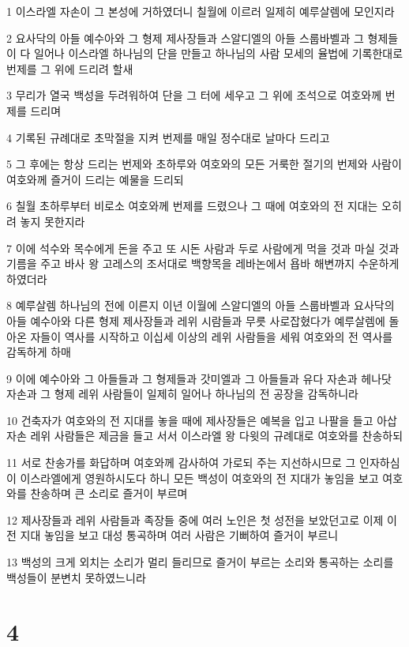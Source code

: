 \par 1 이스라엘 자손이 그 본성에 거하였더니 칠월에 이르러 일제히 예루살렘에 모인지라
\par 2 요사닥의 아들 예수아와 그 형제 제사장들과 스알디엘의 아들 스룹바벨과 그 형제들이 다 일어나 이스라엘 하나님의 단을 만들고 하나님의 사람 모세의 율법에 기록한대로 번제를 그 위에 드리려 할새
\par 3 무리가 열국 백성을 두려워하여 단을 그 터에 세우고 그 위에 조석으로 여호와께 번제를 드리며
\par 4 기록된 규례대로 초막절을 지켜 번제를 매일 정수대로 날마다 드리고
\par 5 그 후에는 항상 드리는 번제와 초하루와 여호와의 모든 거룩한 절기의 번제와 사람이 여호와께 즐거이 드리는 예물을 드리되
\par 6 칠월 초하루부터 비로소 여호와께 번제를 드렸으나 그 때에 여호와의 전 지대는 오히려 놓지 못한지라
\par 7 이에 석수와 목수에게 돈을 주고 또 시돈 사람과 두로 사람에게 먹을 것과 마실 것과 기름을 주고 바사 왕 고레스의 조서대로 백향목을 레바논에서 욥바 해변까지 수운하게 하였더라
\par 8 예루살렘 하나님의 전에 이른지 이년 이월에 스알디엘의 아들 스룹바벨과 요사닥의 아들 예수아와 다른 형제 제사장들과 레위 시람들과 무릇 사로잡혔다가 예루살렘에 돌아온 자들이 역사를 시작하고 이십세 이상의 레위 사람들을 세워 여호와의 전 역사를 감독하게 하매
\par 9 이에 예수아와 그 아들들과 그 형제들과 갓미엘과 그 아들들과 유다 자손과 헤나닷 자손과 그 형제 레위 사람들이 일제히 일어나 하나님의 전 공장을 감독하니라
\par 10 건축자가 여호와의 전 지대를 놓을 때에 제사장들은 예복을 입고 나팔을 들고 아삽 자손 레위 사람들은 제금을 들고 서서 이스라엘 왕 다윗의 규례대로 여호와를 찬송하되
\par 11 서로 찬송가를 화답하며 여호와께 감사하여 가로되 주는 지선하시므로 그 인자하심이 이스라엘에게 영원하시도다 하니 모든 백성이 여호와의 전 지대가 놓임을 보고 여호와를 찬송하며 큰 소리로 즐거이 부르며
\par 12 제사장들과 레위 사람들과 족장들 중에 여러 노인은 첫 성전을 보았던고로 이제 이 전 지대 놓임을 보고 대성 통곡하며 여러 사람은 기뻐하여 즐거이 부르니
\par 13 백성의 크게 외치는 소리가 멀리 들리므로 즐거이 부르는 소리와 통곡하는 소리를 백성들이 분변치 못하였느니라

\chapter{4}

